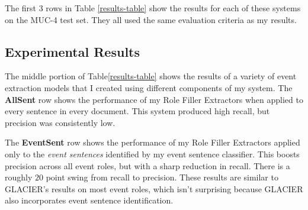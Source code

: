 


The first 3 rows in Table \ref{results-table} show the results
 for each of these systems on the MUC-4 test set. They all used the same
evaluation criteria as my results.

\subsection{Experimental Results}

\label{results-section}

The middle portion of Table\ref{results-table} shows the results of a
variety of event extraction models that I created using different
components of my system. The \textbf{AllSent} row shows the
performance of my Role Filler Extractors when applied to every
sentence in every document. This system produced high recall,
but precision was consistently low.



The \textbf{EventSent} row shows the performance of my Role
Filler Extractors applied only to the {\it event sentences}
identified by my event sentence classifier.  This boosts precision
across all event roles, but with a sharp reduction in recall. There is 
a roughly $20$ point swing from recall to precision.  These
results are similar to GLACIER's results on most event roles, which
isn't surprising because GLACIER also incorporates event sentence identification.












